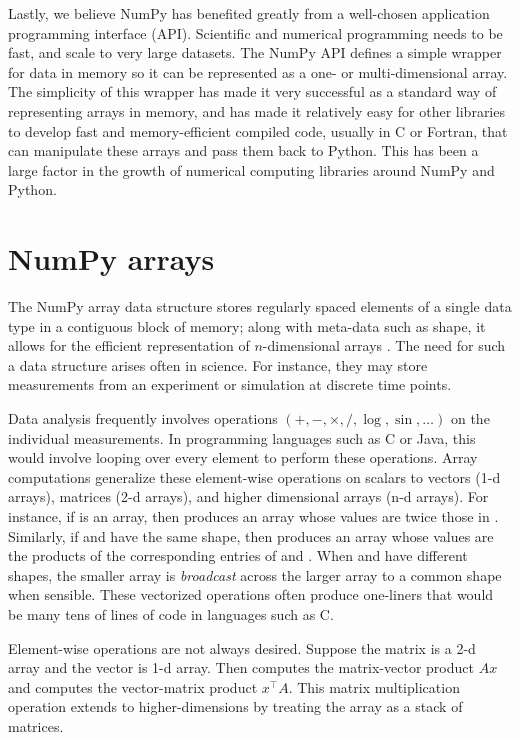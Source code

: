 Lastly, we believe NumPy has benefited greatly from a well-chosen application
programming interface (API).  Scientific and numerical programming needs to be
fast, and scale to very large datasets.  The NumPy API defines a simple wrapper
for data in memory so it can be represented as a one- or multi-dimensional
array.  The simplicity of this wrapper has made it very successful as a
standard way of representing arrays in memory, and has made it relatively easy
for other libraries to develop fast and memory-efficient compiled code, usually
in C or Fortran, that can manipulate these arrays and pass them back to Python.
This has been a large factor in the growth of numerical computing libraries
around NumPy and Python.


\section*{NumPy arrays}

The NumPy array data structure stores regularly spaced elements of a single
data type in a contiguous block of memory; along with meta-data such as shape,
it allows for the efficient representation of $n$-dimensional arrays \cite{vanderwalt2011numpy}.
The need for such a data structure arises often in science.
For instance, they may store measurements from an experiment or simulation
at discrete time points.

Data analysis frequently involves operations $(+, -, \times, /, \log, \sin, \dots)$ on
the individual measurements.
In programming languages such as C or Java, this would involve looping over
every element to perform these operations.
Array computations generalize these element-wise operations on scalars to
vectors (1-d arrays), matrices (2-d arrays), and higher dimensional arrays (n-d
arrays).
For instance, if  is an array, then  produces
an array whose values are twice those in .
Similarly, if  and  have the same shape, then
 produces an array whose values are the products of
the corresponding entries of  and .
When  and  have different shapes, the smaller array is \emph{broadcast}
across the larger array to a common shape when sensible.
These vectorized operations often produce one-liners that would be many tens
of lines of code in languages such as C.

Element-wise operations are not always desired.
Suppose the matrix  is a 2-d array and the vector  is 1-d array.
Then  computes the matrix-vector product $Ax$ and
 computes the vector-matrix product $x^\top A$.
This matrix multiplication operation extends to higher-dimensions by
treating the array as a stack of matrices.

